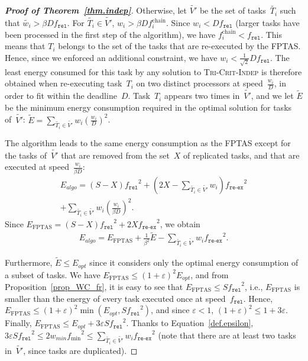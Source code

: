 \documentclass[a4paper]{article}
\theoremstyle{plain}
\theoremstyle{definition}
\theoremstyle{remark}
\newcommand{\fmin}{\ensuremath{f_{\min}}\xspace}
\newcommand{\fr}{\ensuremath{f_{\texttt{rel}}}\xspace}
\newcommand{\freex}{\ensuremath{f_{\texttt{re-ex}}}\xspace}
\newcommand{\indep}{\textsc{Tri-Crit-In\-dep}\xspace}
\begin{document}
\begin{proof}[{\bf Proof of Theorem~\ref{thm.indep}}]
\medskip
Otherwise, let $\tilde{V'}$ be the set of tasks~$\tilde{T_i}$ such that
$\tilde{w_i} > \beta D\fr$. For $\tilde{T_i}\in\tilde{V'}$,  $w_i > \beta D
f_i^{\text{chain}}$. Since $w_i<D\fr$ (larger tasks have been
processed in the first step of the algorithm), we have
$f_i^{\text{chain}}<\fr$.  This means that $T_i$ belongs to the set of
the tasks that are re-executed by the FPTAS.  Hence, since we enforced
an additional constraint, we have $w_i<\frac{1}{\sqrt{2}}D\fr$. The
least energy consumed for this task by any solution to \indep is
therefore obtained when re-execu\-ting task~$T_i$ on two distinct
processors at speed~$\frac{w_i}{D}$, in order to fit within the
deadline~$D$. Task~$T_i$ appears two times in~$\tilde{V'}$, and we let
$\tilde{E}$ be the minimum energy consumption required in the optimal
solution for tasks of~$\tilde{V'}$:
$\tilde{E} = \sum_{\tilde{T_i}\in\tilde{V'}}
      w_i\left(\frac{w_i}{D}\right)^2 $.

\smallskip 
The algorithm leads to the same energy consumption as the FPTAS except
for the tasks of~$\tilde{V'}$ that are removed from the set~$X$ of
replicated tasks, and that are executed at speed~$\frac{w_i}{\beta
  D}$:
\begin{equation*}
\begin{array}{r}
E_{algo} = (S-X) \fr^2 + (2X-\sum_{\tilde{T_i}\in\tilde{V'}}
w_i)\freex^2 \\ + \sum_{\tilde{T_i}\in\tilde{V'}} w_i
\left(\frac{w_i}{\beta D} \right)^2.\end{array}
\end{equation*} 
Since $E_{\text{FPTAS}}=(S-X) \fr^2 + 2X\freex^2$, we obtain
\begin{equation*}\begin{array}{c}
E_{algo} = E_{\text{FPTAS}} + \frac{1}{\beta^2}\tilde{E} -
\sum_{\tilde{T_i}\in\tilde{V'}}w_i\freex^2. \end{array}\end{equation*}

Furthermore, $\tilde{E}\leq E_{opt}$ since it considers only the
optimal energy consumption of a subset of tasks. We have $E_{\text{FPTAS}}
\leq (1+\varepsilon)^2 E_{opt}$, and from
Proposition~\ref{prop_WC_fr}, it is easy to see that 
$E_{\text{FPTAS}}\leq S\fr^2$, i.e., $E_{\text{FPTAS}}$ is smaller than
the energy of every task executed once at speed~\fr. Hence, $E_{\text{FPTAS}}
\leq (1\!+\!\varepsilon)^2 \min(E_{opt},S\fr^2)$, 
and since $\varepsilon < 1$, $(1+\varepsilon)^2 \leq 1+3\varepsilon$. Finally, 
$E_{\text{FPTAS}} \leq E_{opt}+3\varepsilon S\fr^2$. 
Thanks to Equation~\eqref{def.epsilon}, 
$3\varepsilon S\fr^2 \leq 2 w_{min} \fmin^2 \leq
\sum_{\tilde{T_i}\in\tilde{V'}}w_i\freex^2$ (note that there are at
least two tasks in~$\tilde{V'}$, since tasks are duplicated). 


\end{proof}
\end{document}
